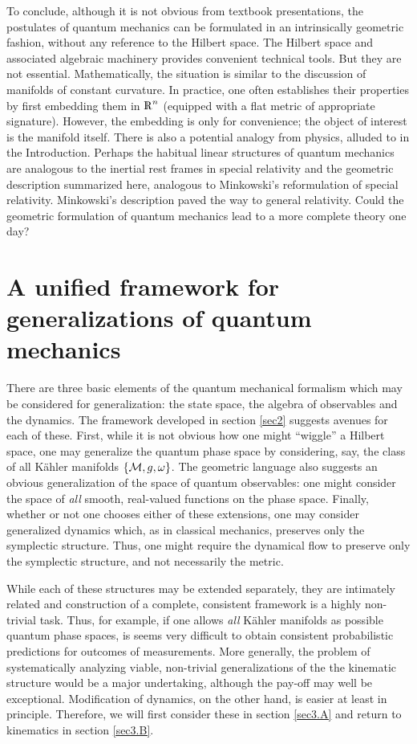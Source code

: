 To conclude, although it is not obvious from textbook presentations,
the postulates of quantum mechanics can be formulated in an
intrinsically geometric fashion, without any reference to the Hilbert
space. The Hilbert space and associated algebraic machinery provides
convenient technical tools. But they are not
essential. Mathematically, the situation is similar to the discussion
of manifolds of constant curvature.  In practice, one often
establishes their properties by first embedding them in $\R^n$
(equipped with a flat metric of appropriate signature). However, the
embedding is only for convenience; the object of interest is the
manifold itself. There is also a potential analogy from physics,
alluded to in the Introduction.  Perhaps the habitual linear
structures of quantum mechanics are analogous to the inertial rest
frames in special relativity and the geometric description summarized
here, analogous to Minkowski's reformulation of special relativity.
Minkowski's description paved the way to general relativity.  Could
the geometric formulation of quantum mechanics lead to a more complete
theory one day?


\section{A unified framework for generalizations of quantum 
mechanics} \label{sec3}

There are three basic elements of the quantum mechanical formalism
which may be considered for generalization: the state space, the
algebra of observables and the dynamics.  The framework developed in
section \ref{sec2} suggests avenues for each of these.  First, while
it is not obvious how one might ``wiggle'' a Hilbert space, one may
generalize the quantum phase space by considering, say, the class of
all K\"ahler manifolds $\{ {\cal M}, g, \omega \}$.  The geometric language also
suggests an obvious generalization of the space of quantum
observables: one might consider the space of {\em all} smooth,
real-valued functions on the phase space.  Finally, whether or not one
chooses either of these extensions, one may consider generalized
dynamics which, as in classical mechanics, preserves only the
symplectic structure. Thus, one might require the dynamical flow to
preserve only the symplectic structure, and not necessarily the
metric.

While each of these structures may be extended separately, they are
intimately related and construction of a complete, consistent
framework is a highly non-trivial task. Thus, for example, if one
allows {\it all} K\"ahler manifolds as possible quantum phase spaces,
is seems very difficult to obtain consistent probabilistic predictions
for outcomes of measurements. More generally, the problem of
systematically analyzing viable, non-trivial generalizations of the
the kinematic structure would be a major undertaking, although the
pay-off may well be exceptional. Modification of dynamics, on the
other hand, is easier at least in principle. Therefore, we will first
consider these in section \ref{sec3.A} and return to kinematics in
section \ref{sec3.B}.


